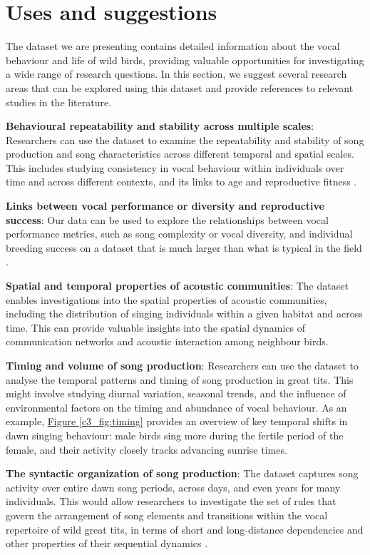 \section{Uses and suggestions}

The dataset we are presenting contains detailed information about the vocal behaviour and life of wild birds, providing valuable opportunities for investigating a wide range of research questions. In this section, we suggest several research areas that can be explored using this dataset and provide references to relevant studies in the literature.

\textbf{Behavioural repeatability and stability across multiple scales}: Researchers can use the dataset to examine the repeatability and stability of song production and song characteristics across different temporal and spatial scales. This includes studying consistency in vocal behaviour within individuals over time and across different contexts, and its links to age \parencite{rivera-gutierrez2012, zipple2019} and reproductive fitness \parencite{sierro2023}.

\textbf{Links between vocal performance or diversity and reproductive success}: Our data can be used to explore the relationships between vocal performance metrics, such as song complexity or vocal diversity, and individual breeding success on a dataset that is much larger than what is typical in the field \parencite{hutfluss2022, beecher2020a, crates2021, hiebert1989, mcgregor1981}. 

\textbf{Spatial and temporal properties of acoustic communities}: The dataset enables investigations into the spatial properties of acoustic communities, including the distribution of singing individuals within a given habitat and across time. This can provide valuable insights into the spatial dynamics of communication networks and acoustic interaction among neighbour birds.

\textbf{Timing and volume of song production}: Researchers can use the dataset to analyse the temporal patterns and timing of song production in great tits. This might involve studying diurnal variation, seasonal trends, and the influence of environmental factors on the timing and abundance of vocal behaviour. As an example, \hyperref[c3_fig:timing]{Figure \ref*{c3_fig:timing}} provides an overview of key temporal shifts in dawn singing behaviour: male birds sing more during the fertile period of the female, and their activity closely tracks advancing sunrise times.

\textbf{The syntactic organization of song production}: The dataset captures song activity over entire dawn song periods, across days, and even years for many individuals. This would allow researchers to investigate the set of rules that govern the arrangement of song elements and transitions within the vocal repertoire of wild great tits, in terms of short and long-distance dependencies and other properties of their sequential dynamics \parencite{hedley2018, lachlan2010, sainburg2019, searcy2022}.

